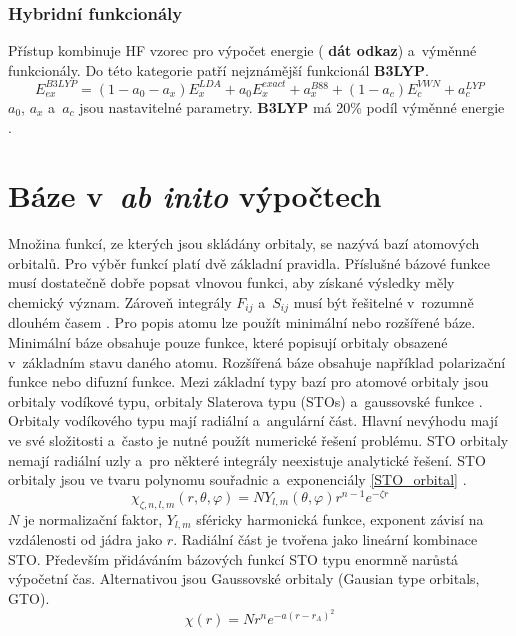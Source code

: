 \documentclass[
  printed, %
  table,   %
  lof,     %
  lot,     %
  oneside,
]{fithesis3}
\begin{document}
\subsubsection{Hybridní funkcionály}
Přístup kombinuje HF vzorec pro výpočet energie ( \textbf{dát odkaz}) a~výměnné funkcionály. 
Do této kategorie patří nejznámější funkcionál \textbf{B3LYP}.
\begin{equation}
E_{ex}^{B3LYP} = (1-a_0-a_x)E_x^{LDA} + a_0E_x^{exact} + a_x^{B88} + (1-a_c)E_c^{VWN} + a_c^{LYP}
\label{B3LYP_rovnice}
\end{equation}
$a_0$, $a_x$ a~$a_c$ jsou nastavitelné parametry. \textbf{B3LYP} má 20\% podíl výměnné energie \cite{dftshrnutivysledky}.

\section{Báze v~\textit{ab inito} výpočtech }\label{kapitola_baze}
Množina funkcí, ze kterých jsou skládány orbitaly, se nazývá bazí atomových orbitalů. Pro výběr funkcí platí dvě základní pravidla. Příslušné bázové funkce musí dostatečně dobře popsat vlnovou funkci, aby získané výsledky měly chemický význam. Zároveň integrály $F_{ij}$ a~$S_{ij}$ musí být řešitelné v~rozumně dlouhém časem \cite{lowe2011quantum}.
Pro popis atomu lze použít minimální nebo rozšířené báze. Minimální báze obsahuje pouze funkce, které popisují orbitaly obsazené v~základním stavu daného atomu. Rozšířená báze obsahuje například polarizační funkce nebo difuzní funkce. Mezi základní typy bazí pro atomové orbitaly jsou orbitaly vodíkové typu, orbitaly Slaterova typu (STOs) a~gaussovské funkce \cite{dftshrnutivysledky}.
Orbitaly vodíkového typu mají radiální a~angulární část. Hlavní nevýhodu mají ve své složitosti a~často je nutné použít numerické řešení problému. STO orbitaly nemají radiální uzly a~pro některé integrály neexistuje analytické řešení. STO orbitaly jsou ve tvaru polynomu souřadnic a~exponenciály \ref{STO_orbital} \cite{jensen2007introduction}.
\begin{equation}
\chi_{\zeta, n, l, m}(r, \theta, \varphi) = NY_{l,m} (\theta, \varphi) r^{n-1} e^{-\zeta r}
\label{STO_orbital} 
\end{equation}
$N$ je normalizační faktor, $Y_{l,m}$ sféricky harmonická funkce, exponent závisí na vzdálenosti od jádra jako $r$. Radiální část je tvořena jako lineární kombinace STO. Především přidáváním bázových funkcí STO typu enormně narůstá výpočetní čas. Alternativou jsou Gaussovské orbitaly (Gausian type orbitals, GTO).
\begin{equation}
\chi(r) = Nr^n e^{-a(r-r_A)^2}
\end{equation}
\end{document}

